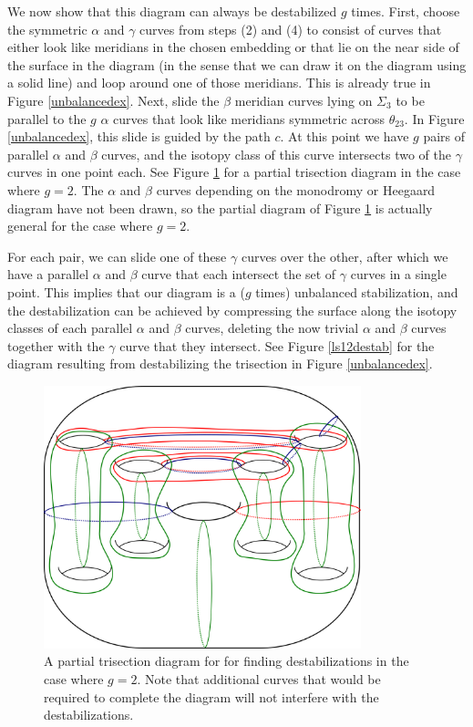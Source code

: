 \documentclass[12pt]{amsart}
\theoremstyle{definition}
\theoremstyle{remark}
\begin{document}
We now show that this diagram can always be destabilized $g$ times.
First, choose the symmetric $\alpha$ and $\gamma$ curves from steps (2) and (4) to consist of curves that either look like meridians in the chosen embedding or that lie on the near side of the surface in the diagram (in the sense that we can draw it on the diagram using a solid line) and loop around one of those meridians.
 This is already true in Figure \ref{unbalancedex}.
Next, slide the $\beta$ meridian curves lying on $\Sigma_3$ to be parallel to the $g$ $\alpha$ curves that look like meridians symmetric across $\theta_{23}$.
In Figure \ref{unbalancedex}, this slide is guided by the path $c$.
At this point we have $g$ pairs of parallel $\alpha$ and $\beta$ curves, and the isotopy class of this curve intersects two of the $\gamma$ curves in one point each.
See Figure \ref{destabpartial} for a partial trisection diagram in the case where $g=2$.
The $\alpha$ and $\beta$ curves depending on the monodromy or Heegaard diagram have not been drawn, so the partial diagram of Figure \ref{destabpartial} is actually general for the case where $g=2$.

For each pair, we can slide one of these $\gamma$ curves over the other, after which we have a parallel $\alpha$ and $\beta$ curve that each intersect the set of $\gamma$ curves in a single point.
This implies that our diagram is a ($g$ times) unbalanced stabilization, and the destabilization can be achieved by compressing the surface along the isotopy classes of each parallel $\alpha$ and $\beta$ curves, deleting the now trivial $\alpha$ and $\beta$ curves together with the $\gamma$ curve that they intersect.
See Figure \ref{ls12destab} for the diagram resulting from destabilizing the trisection in Figure \ref{unbalancedex}.


\begin{figure}[h]
\centering
\includegraphics[height=3in]{finddestabpartial.png}
\caption{A partial trisection diagram for for finding destabilizations in the case where $g=2$.
Note that additional curves that would be required to complete the diagram will not interfere with the destabilizations.}
\label{destabpartial}
\end{figure}
\end{document}
